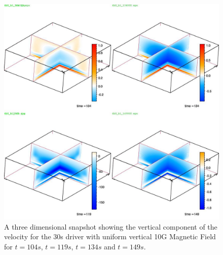 \documentclass{aa}
\begin{document}

\begin{figure}[h]
\includegraphics[scale=0.5]{images/4b0_b1_3d.jpg}
\caption{A three dimensional snapshot showing the vertical component of the velocity for the 30s driver  with uniform vertical 10G Magnetic Field for $t=104s$, $t=119s$, $t=134s$ and $t=149s$. }
\end{figure}



\end{document}
